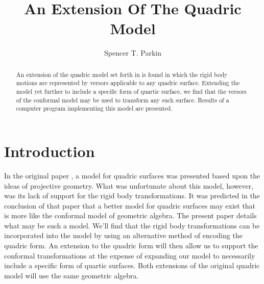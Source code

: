 \documentclass{birkjour}
\theoremstyle{definition}
\theoremstyle{remark}
\numberwithin{equation}{section}
\begin{document}
\title{An Extension Of The Quadric Model}

\author{Spencer T. Parkin}
\address{%
2113 S. Claremont Dr.\\
Bountiful, Utah  84010\\
USA}





\begin{abstract}
An extension of the quadric model set forth in \cite{Parkin12} is
found in which the rigid body motions are represented by
versors applicable to any quadric surface.
Extending the model yet further to include
a specific form of quartic surface, we find that the versors of
the conformal model may be used to transform any such surface.
Results of a computer program implementing this model are presented.
\end{abstract}

\maketitle

\section{Introduction}

In the original paper \cite{Parkin12}, a model for quadric surfaces was
presented based upon the ideas of projective geometry.  What was unfortunate
about this model, however, was its lack of support for the rigid body transformations.  It was
predicted in the conclusion of that paper that a better model for quadric
surfaces may exist that is more like the conformal model of geometric algebra.
The present paper details what may be such a model.  We'll find that the rigid
body transformations can be incorporated into the model by using an alternative
method of encoding the quadric form.  An extension to the quadric form
will then allow us to support the conformal transformations at the expense of
expanding our model to necessarily include a specific form of quartic surfaces.  Both extensions
of the original quadric model will use the same geometric algebra.
\end{document}
